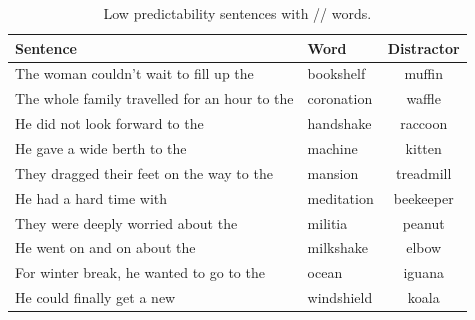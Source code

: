 \begin{table}[!h]
\caption{Low predictability sentences with /\textesh/ words.}
\label{tbl:sentlowsh}
\small
\centering
\begin{tabular}{llc}
\toprule
Sentence                                                                     & Word        & Distractor  \\
\midrule
The woman couldn't wait to fill up the        & bookshelf  & muffin     \\
The whole family travelled for an hour to the & coronation & waffle     \\
He did not look forward to the                & handshake  & raccoon    \\
He gave a wide berth to the                   & machine    & kitten     \\
They dragged their feet on the way to the     & mansion    & treadmill  \\
He had a hard time with                       & meditation & beekeeper  \\
They were deeply worried about the            & militia    & peanut     \\
He went on and on about the                   & milkshake  & elbow      \\
For winter break, he wanted to go to the      & ocean      & iguana     \\
He could finally get a new                    & windshield & koala     \\
\bottomrule
\end{tabular}
\end{table}

